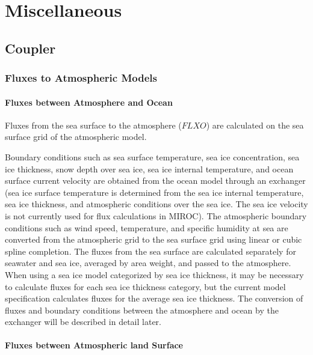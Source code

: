 \hypertarget{miscellaneous}{%
\section{Miscellaneous}\label{miscellaneous}}

\hypertarget{coupler}{%
\subsection{Coupler}\label{coupler}}

\hypertarget{fluxes-to-atmospheric-models}{%
\subsubsection{Fluxes to Atmospheric
Models}\label{fluxes-to-atmospheric-models}}

\hypertarget{fluxes-between-atmosphere-and-ocean}{%
\paragraph{Fluxes between Atmosphere and
Ocean}\label{fluxes-between-atmosphere-and-ocean}}

Fluxes from the sea surface to the atmosphere (\(FLXO\)) are calculated
on the sea surface grid of the atmospheric model.

Boundary conditions such as sea surface temperature, sea ice
concentration, sea ice thickness, snow depth over sea ice, sea ice
internal temperature, and ocean surface current velocity are obtained
from the ocean model through an exchanger (sea ice surface temperature
is determined from the sea ice internal temperature, sea ice thickness,
and atmospheric conditions over the sea ice. The sea ice velocity is not
currently used for flux calculations in MIROC). The atmospheric boundary
conditions such as wind speed, temperature, and specific humidity at sea
are converted from the atmospheric grid to the sea surface grid using
linear or cubic spline completion. The fluxes from the sea surface are
calculated separately for seawater and sea ice, averaged by area weight,
and passed to the atmosphere. When using a sea ice model categorized by
sea ice thickness, it may be necessary to calculate fluxes for each sea
ice thickness category, but the current model specification calculates
fluxes for the average sea ice thickness. The conversion of fluxes and
boundary conditions between the atmosphere and ocean by the exchanger
will be described in detail later.

\hypertarget{fluxes-between-atmospheric-land-surface}{%
\paragraph{Fluxes between Atmospheric land
Surface}\label{fluxes-between-atmospheric-land-surface}}

